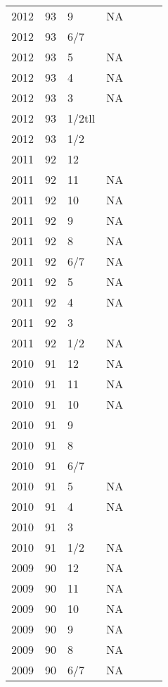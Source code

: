 \begin{longtable}{ |l|l|l|l|p{2.7cm}|l|p{2cm}| }
 2012 & 93 & 9     &    NA   &  &  & \\
 2012 & 93 &   6/7 &         &  &  & \\
 2012 & 93 &     5 &    NA   &  &  & \\
 2012 & 93 &     4 &    NA   &  &  & \\
 2012 & 93 &     3 &    NA   &  &  & \\
 2012 & 93 & 1/2tll&         &  &  & \\
 2012 & 93 &   1/2 &         &  &  & \\
 2011 & 92 &    12 &         &  &  & \\
 2011 & 92 &    11 &    NA   &  &  & \\
 2011 & 92 &    10 &    NA   &  &  & \\
 2011 & 92 &     9 &    NA   &  &  & \\
 2011 & 92 &     8 &    NA   &  &  & \\
 2011 & 92 &   6/7 &    NA   &  &  & \\
 2011 & 92 &     5 &     NA  &  &  & \\
 2011 & 92 &     4 &     NA  &  &  & \\
 2011 & 92 &     3 &         &  &  & \\
 2011 & 92 &   1/2 &     NA  &  &  & \\
 2010 & 91 &   12  &      NA &  &  & \\
 2010 & 91 &    11 &      NA &  &  & \\
 2010 & 91 &    10 &      NA &  &  & \\
 2010 & 91 &     9 &         &  &  & \\
 2010 & 91 &     8 &         &  &  & \\
 2010 & 91 &   6/7 &         &  &  & \\
 2010 & 91 &     5 &     NA  &  &  & \\
 2010 & 91 &     4 &     NA  &  &  & \\
 2010 & 91 &     3 &         &  &  & \\
 2010 & 91 &   1/2 &      NA &  &  & \\
 2009 & 90 &    12 &      NA &  &  & \\
 2009 & 90 &    11 &      NA &  &  & \\
 2009 & 90 &    10 &      NA &  &  & \\
 2009 & 90 &     9 &      NA &  &  & \\
 2009 & 90 &     8 &      NA &  &  & \\
 2009 & 90 &   6/7 &      NA &  &  & \\

\end{longtable}
